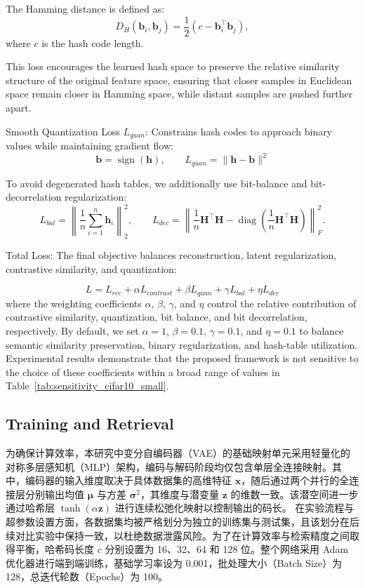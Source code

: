 \documentclass[conference]{IEEEtran}
\begin{document}
The Hamming distance is defined as:
\[
D_H(\mathbf{b}_i, \mathbf{b}_j)
=
\frac{1}{2}\left(c - \mathbf{b}_i^\top \mathbf{b}_j\right),
\]
where $c$ is the hash code length.

This loss encourages the learned hash space to preserve the relative similarity structure of the original feature space, ensuring that closer samples in Euclidean space remain closer in Hamming space, while distant samples are pushed further apart.

Smooth Quantization Loss $L_{quan}$: 
Constrains hash codes to approach binary values while maintaining gradient flow:
\[
\mathbf{b}=\operatorname{sign}(\mathbf{h}), \qquad
L_{quan} = \|\mathbf{h} - \mathbf{b}\|^2
\]

To avoid degenerated hash tables, we additionally use bit-balance and bit-decorrelation regularization:
\[
L_{bal}=\left\|\frac{1}{n}\sum_{i=1}^{n}\mathbf{h}_i\right\|_2^2,\qquad
L_{dec}=\left\|\frac{1}{n}\mathbf{H}^{\top}\mathbf{H}
-\operatorname{diag}\left(\frac{1}{n}\mathbf{H}^{\top}\mathbf{H}\right)\right\|_F^2 .
\]

Total Loss:
The final objective balances reconstruction, latent regularization, contrastive similarity, and quantization:

\begin{equation}
L =  L_{rec} + \alpha L_{contrast} + \beta L_{quan}
    + \gamma L_{bal} + \eta L_{dec}
\label{eqL}
\end{equation}
where the weighting coefficients $\alpha$, $\beta$, $\gamma$, and $\eta$ control the relative contribution of contrastive similarity, quantization, bit balance, and bit decorrelation, respectively. By default, we set $\alpha = 1$, $\beta = 0.1$, $\gamma = 0.1$, and $\eta = 0.1$ to balance semantic similarity preservation, binary regularization, and hash-table utilization. Experimental results demonstrate that the proposed framework is not sensitive to the choice of these coefficients within a broad range of values in Table~\ref{tab:sensitivity_cifar10_small}.



\subsection{Training and Retrieval}
为确保计算效率，本研究中变分自编码器（VAE）的基础映射单元采用轻量化的对称多层感知机（MLP）架构，编码与解码阶段均仅包含单层全连接映射。其中，编码器的输入维度取决于具体数据集的高维特征 $\mathbf{x}$，随后通过两个并行的全连接层分别输出均值 $\boldsymbol{\mu}$ 与方差 $\boldsymbol{\sigma}^2$，其维度与潜变量 $\mathbf{z}$ 的维数一致。该潜空间进一步通过哈希层 $\tanh(\alpha \mathbf{z})$ 进行连续松弛化映射以控制输出的码长。
在实验流程与超参数设置方面，各数据集均被严格划分为独立的训练集与测试集，且该划分在后续对比实验中保持一致，以杜绝数据泄露风险。为了在计算效率与检索精度之间取得平衡，哈希码长度 $c$ 分别设置为 16、32、64 和 128 位。整个网络采用 Adam 优化器进行端到端训练，基础学习率设为 0.001，批处理大小（Batch Size）为 128，总迭代轮数（Epochs）为 100。
\end{document}

